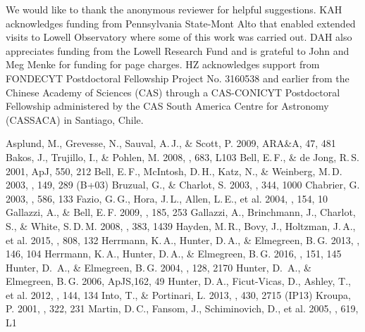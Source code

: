 \documentclass[12pt]{emulateapj}
\begin{document}
\acknowledgments
We would like to thank the anonymous reviewer for helpful suggestions.  KAH acknowledges funding from Pennsylvania State-Mont Alto that enabled extended visits to Lowell Observatory where some of this work was carried out. DAH also appreciates funding from the Lowell Research Fund and is grateful to John and Meg Menke for funding for page charges. HZ acknowledges support from FONDECYT Postdoctoral Fellowship Project No. 3160538 and earlier from the Chinese Academy of Sciences (CAS) through a CAS-CONICYT Postdoctoral Fellowship administered by the CAS South America Centre for Astronomy (CASSACA) in Santiago, Chile.

\begin{thebibliography}{}

  Asplund, M., Grevesse, N., Sauval, A.\,J., \& Scott, P. 2009, ARA\&A, 47, 481
 Bakos, J., Trujillo, I., \& Pohlen, M. 2008, \apj, 683, L103 
 Bell, E.\,F., \& de Jong, R.\,S. 2001, ApJ, 550, 212
 Bell, E.\,F., McIntosh, D.\,H., Katz, N., \& Weinberg, M.\,D. 2003, \apjs, 149, 289 (B+03)
 Bruzual, G., \& Charlot, S. 2003, \mnras, 344, 1000
 Chabrier, G. 2003, \apj, 586, 133
 Fazio, G.\,G., Hora, J.\,L., Allen, L.\,E., et al. 2004, \apjs, 154, 10
 Gallazzi, A., \& Bell, E.\,F. 2009, \apjs, 185, 253
 Gallazzi, A., Brinchmann, J., Charlot, S., \& White, S.\,D.\,M. 2008, \mnras, 383, 1439
 Hayden, M.\,R., Bovy, J., Holtzman, J.\,A., et al. 2015, \apj, 808, 132
 Herrmann, K.\,A., Hunter, D.\,A., \& Elmegreen, B.\,G. 2013, \aj, 146, 104
 Herrmann, K.\,A., Hunter, D.\,A., \& Elmegreen, B.\,G. 2016, \aj, 151, 145
 Hunter, D.\ A., \& Elmegreen, B.\,G. 2004, \aj, 128, 2170
 Hunter, D.\ A., \& Elmegreen, B.\,G. 2006, ApJS,162, 49
 Hunter, D.\,A., Ficut-Vicas, D., Ashley, T., et al. 2012, \aj, 144, 134
 Into, T., \& Portinari, L. 2013, \mnras, 430, 2715 (IP13)
 Kroupa, P. 2001, \mnras, 322, 231
 Martin, D.\,C., Fansom, J., Schiminovich, D., et al. 2005, \apj, 619, L1

\end{thebibliography}
\end{document}

